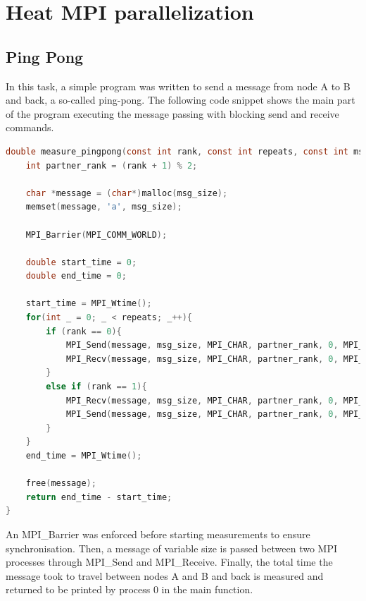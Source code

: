 \chapter{Heat MPI parallelization}


\section{Ping Pong}

In this task, a simple program was written to send a message from node A to B and back, a so-called ping-pong. The following code snippet shows the main part of the program executing the message passing with blocking send and receive commands.

\begin{lstlisting}[language=C]
double measure_pingpong(const int rank, const int repeats, const int msg_size) {
    int partner_rank = (rank + 1) % 2;

    char *message = (char*)malloc(msg_size);
    memset(message, 'a', msg_size);

    MPI_Barrier(MPI_COMM_WORLD);

    double start_time = 0;
    double end_time = 0;

    start_time = MPI_Wtime();
    for(int _ = 0; _ < repeats; _++){
        if (rank == 0){
            MPI_Send(message, msg_size, MPI_CHAR, partner_rank, 0, MPI_COMM_WORLD);
            MPI_Recv(message, msg_size, MPI_CHAR, partner_rank, 0, MPI_COMM_WORLD, MPI_STATUS_IGNORE);;
        }
        else if (rank == 1){
            MPI_Recv(message, msg_size, MPI_CHAR, partner_rank, 0, MPI_COMM_WORLD, MPI_STATUS_IGNORE);;
            MPI_Send(message, msg_size, MPI_CHAR, partner_rank, 0, MPI_COMM_WORLD);
        }
    }
    end_time = MPI_Wtime();

    free(message);
    return end_time - start_time;
}
\end{lstlisting}

An MPI\_Barrier was enforced before starting measurements to ensure synchronisation. Then, a message of variable size is passed between two MPI processes through MPI\_Send and MPI\_Receive. Finally, the total time the message took to travel between nodes A and B and back is measured and returned to be printed by process 0 in the main function.

